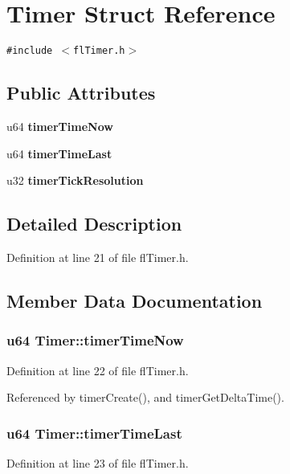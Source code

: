 \section{Timer Struct Reference}
\label{structTimer}
{\tt \#include $<$fl\-Timer.h$>$}

\subsection*{Public Attributes}
\begin{CompactItemize}
\item 
u64 {\bf timer\-Time\-Now}
\item 
u64 {\bf timer\-Time\-Last}
\item 
u32 {\bf timer\-Tick\-Resolution}
\end{CompactItemize}


\subsection{Detailed Description}




Definition at line 21 of file fl\-Timer.h.

\subsection{Member Data Documentation}
\subsubsection{\setlength{\rightskip}{0pt plus 5cm}u64 {\bf Timer::timer\-Time\-Now}}\label{structTimer_5fb1e765ab340d0849b96609dd5bed9e}




Definition at line 22 of file fl\-Timer.h.

Referenced by timer\-Create(), and timer\-Get\-Delta\-Time().
\subsubsection{\setlength{\rightskip}{0pt plus 5cm}u64 {\bf Timer::timer\-Time\-Last}}\label{structTimer_7e62a530233c1c72e5af52cebcb45e65}




Definition at line 23 of file fl\-Timer.h.

